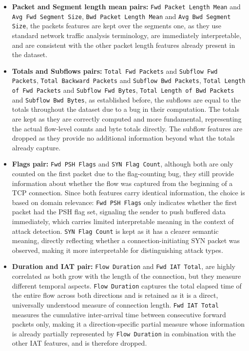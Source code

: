 \begin{itemize}
    \item \textbf{Packet and Segment length mean pairs:} \texttt{Fwd Packet Length Mean} and \texttt{Avg Fwd Segment Size}, \texttt{Bwd Packet Length Mean} and \texttt{Avg Bwd Segment Size}, the packets features are kept over the segments one, as they use standard network traffic analysis terminology, are immediately interpretable, and are consistent with the other packet length features already present in the dataset.

    \item \textbf{Totals and Subflows pairs:} \texttt{Total Fwd Packets} and \texttt{Subflow Fwd Packets}, \texttt{Total Backward Packets} and \texttt{Subflow Bwd Packets}, \texttt{Total Length of Fwd Packets} and \texttt{Subflow Fwd Bytes}, \texttt{Total Length of Bwd Packets} and \texttt{Subflow Bwd Bytes}, as established before, the subflows are equal to the totals throughout the dataset due to a bug in their computation. The totals are kept as they are correctly computed and more fundamental, representing the actual flow-level counts and byte totals directly. The subflow features are dropped as they provide no additional information beyond what the totals already capture.

    \item \textbf{Flags pair:} \texttt{Fwd PSH Flags} and \texttt{SYN Flag Count}, although both are only counted on the first packet due to the flag-counting bug, they still provide information about whether the flow was captured from the beginning of a TCP connection. Since both features carry identical information, the choice is based on domain relevance: \texttt{Fwd PSH Flags} only indicates whether the first packet had the PSH flag set, signaling the sender to push buffered data immediately, which carries limited interpretable meaning in the context of attack detection. \texttt{SYN Flag Count} is kept as it has a clearer semantic meaning, directly reflecting whether a connection-initiating SYN packet was observed, making it more interpretable for distinguishing attack types.

    \item \textbf{Duration and IAT pair:} \texttt{Flow Duration} and \texttt{Fwd IAT Total}, are highly correlated as both grow with the length of the connection, but they measure different temporal aspects. \texttt{Flow Duration} captures the total elapsed time of the entire flow across both directions and is retained as it is a direct, universally understood measure of connection length. \texttt{Fwd IAT Total} measures the cumulative inter-arrival time between consecutive forward packets only, making it a direction-specific partial measure whose information is already partially represented by \texttt{Flow Duration} in combination with the other IAT features, and is therefore dropped.


\end{itemize}

